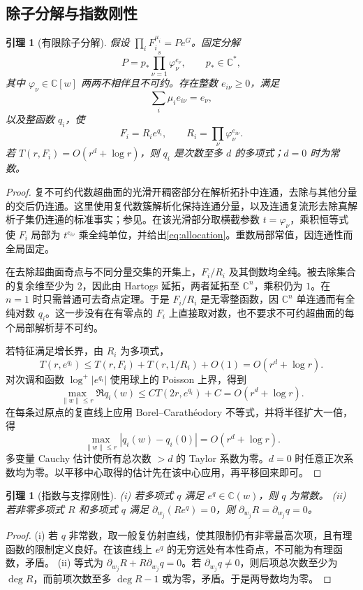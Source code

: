 \documentclass[UTF8,11pt,a4paper,fontset=fandol]{ctexart}
\newtheorem{lemma}[theorem]{引理}
\theoremstyle{definition}\newtheorem{definition}[theorem]{定义}
\theoremstyle{remark}\newtheorem{remark}[theorem]{注}
\newcommand{\C}{\mathbb C}\newcommand{\N}{\mathbb N}
\begin{document}
\subsection{除子分解与指数刚性}
\begin{lemma}[有限除子分解]\label{lem:divisor}
假设 $\prod_iF_i^{\mu_i}=Pe^G$。固定分解
\begin{equation}\label{eq:factor}
P=p_*\prod_{\nu=1}^s\varphi_\nu^{e_\nu},\qquad p_*\in\C^*,
\end{equation}
其中 $\varphi_\nu\in\C[w]$ 两两不相伴且不可约。存在整数 $e_{i\nu}\ge0$，满足
\begin{equation}\label{eq:allocation}
\sum_i\mu_i e_{i\nu}=e_\nu,
\end{equation}
以及整函数 $q_i$，使
\[
F_i=R_i e^{q_i},\qquad R_i=\prod_\nu\varphi_\nu^{e_{i\nu}}.
\]
若 $T(r,F_i)=O(r^d+\log r)$，则 $q_i$ 是次数至多 $d$ 的多项式；$d=0$ 时为常数。
\end{lemma}
\begin{proof}
复不可约代数超曲面的光滑开稠密部分在解析拓扑中连通，去除与其他分量的交后仍连通。这里使用复代数簇解析化保持连通分量，以及连通复流形去除真解析子集仍连通的标准事实；参见\cite{GR1965,Achinger2025}。在该光滑部分取横截参数 $t=\varphi_\nu$，乘积恒等式使 $F_i$ 局部为 $t^{e_{i\nu}}$ 乘全纯单位，并给出\eqref{eq:allocation}。重数局部常值，因连通性而全局固定。

在去除超曲面奇点与不同分量交集的开集上，$F_i/R_i$ 及其倒数均全纯。被去除集合的复余维至少为 $2$，因此由 Hartogs 延拓，两者延拓至 $\C^n$，乘积仍为 $1$。在 $n=1$ 时只需普通可去奇点定理。于是 $F_i/R_i$ 是无零整函数，因 $\C^n$ 单连通而有全纯对数 $q_i$。这一步没有在有零点的 $F_i$ 上直接取对数，也不要求不可约超曲面的每个局部解析芽不可约。

若特征满足增长界，由 $R_i$ 为多项式，
\[
T(r,e^{q_i})\le T(r,F_i)+T(r,1/R_i)+O(1)=O(r^d+\log r).
\]
对次调和函数 $\log^+|e^{q_i}|$ 使用球上的 Poisson 上界，得到
\[
\max_{\lVert w\rVert\le r}\Re q_i(w)
\le C T(2r,e^{q_i})+C=O(r^d+\log r).
\]
在每条过原点的复直线上应用 Borel--Carathéodory 不等式，并将半径扩大一倍，得
\[
\max_{\lVert w\rVert\le r}|q_i(w)-q_i(0)|=O(r^d+\log r).
\]
多变量 Cauchy 估计使所有总次数 $>d$ 的 Taylor 系数为零。$d=0$ 时任意正次系数均为零。以平移中心取得的估计先在该中心应用，再平移回来即可。
\end{proof}

\begin{lemma}[指数与支撑刚性]\label{lem:rigidity}
(i) 若多项式 $q$ 满足 $e^q\in\C(w)$，则 $q$ 为常数。
(ii) 若非零多项式 $R$ 和多项式 $q$ 满足 $\partial_{w_j}(Re^q)=0$，则 $\partial_{w_j}R=\partial_{w_j}q=0$。
\end{lemma}
\begin{proof}
(i) 若 $q$ 非常数，取一般复仿射直线，使其限制仍有非零最高次项，且有理函数的限制定义良好。在该直线上 $e^q$ 的无穷远处有本性奇点，不可能为有理函数，矛盾。
(ii) 等式为 $\partial_{w_j}R+R\partial_{w_j}q=0$。若 $\partial_{w_j}q\ne0$，则后项总次数至少为 $\deg R$，而前项次数至多 $\deg R-1$ 或为零，矛盾。于是两导数均为零。
\end{proof}
\end{document}
